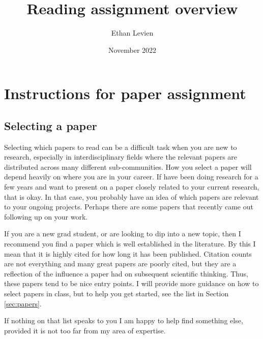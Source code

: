 \documentclass{amsart}
\title{Reading assignment overview}
\author{Ethan Levien}
\date{November 2022}
\begin{document}
\maketitle


\section{Instructions for paper assignment}

\subsection{Selecting a paper}

Selecting which papers to read can be a difficult task when you are new to research, especially in interdisciplinary fields where the relevant papers are distributed across many different sub-communities. How you select a paper will depend heavily on where you are in your career. If have been doing research for a few years and want to present on a paper closely related to your current research, that is okay. In that case, you probably have an idea of which papers are relevant to your ongoing projects. Perhaps there are some papers that recently came out following up on your work.

If you are a new grad student, or are looking to dip into a new topic, then I recommend you find a paper which is well established in the literature. By this I mean that it is highly cited for how long it has been published.  Citation counts are not everything and many great papers are poorly cited, but they are a reflection of the influence a paper had on subsequent scientific thinking. Thus, these papers tend to be nice entry points. I will provide more guidance on how to select papers in class, but to help you get started, see the list in Section \ref{sec:papers}.

If nothing on that list speaks to you I am happy to help find something else, provided it is not too far from my area of expertise.
\end{document}
